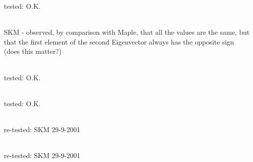 \begin{DoxyRefList}
tested\+: O.\+K.  
\item[Member \doxylink{classcsmp_1_1_tensor_variable_3_013_u_01_4_a911a0e44c37ac1d93f145c097c00348d}{csmp\+::Tensor\+Variable\texorpdfstring{$<$}{<} 3U \texorpdfstring{$>$}{>}\+::Eigen} (\doxylink{classcsmp_1_1_vector_variable_3_013_u_01_4}{Vector\+Variable$<$ 3\+U $>$} \&vv\+Eigenvalues, \doxylink{classcsmp_1_1_tensor_variable_3_013_u_01_4}{Tensor\+Variable$<$ 3\+U $>$} \&tv\+Eigenvectors, bool b\+Normalize) const]\hfill \\
\label{test__test000066}%
%
SKM -\/ observed, by comparison with Maple, that all the values are the same, but that the first element of the second Eigenvector always has the opposite sign (does this matter?) 
\item[Member \doxylink{classcsmp_1_1_tensor_variable_3_013_u_01_4_aa5d0acb3049f7099a61713cdcb63bb6c}{csmp\+::Tensor\+Variable\texorpdfstring{$<$}{<} 3U \texorpdfstring{$>$}{>}\+::Identity} ()]\hfill \\
\label{test__test000058}%
%
tested\+: O.\+K.  
\item[Member \doxylink{classcsmp_1_1_tensor_variable_3_013_u_01_4_ae2dbed54f20a5f66071af484bfe37e03}{csmp\+::Tensor\+Variable\texorpdfstring{$<$}{<} 3U \texorpdfstring{$>$}{>}\+::Inverse} () const]\hfill \\
\label{test__test000061}%
%
tested\+: O.\+K.  
\item[Member \doxylink{classcsmp_1_1_tensor_variable_3_013_u_01_4_ad3b45ec9f9b0c9b6c7b664607525fe05}{csmp\+::Tensor\+Variable\texorpdfstring{$<$}{<} 3U \texorpdfstring{$>$}{>}\+::Is\+Within\+Range} (double vmin, double vmax) const]\hfill \\
\label{test__test000064}%
%
re-\/tested\+: SKM 29-\/9-\/2001  
\item[Member \doxylink{classcsmp_1_1_tensor_variable_3_013_u_01_4_a6aa05318f3258073a8426868cfdf5e9b}{csmp\+::Tensor\+Variable\texorpdfstring{$<$}{<} 3U \texorpdfstring{$>$}{>}\+::Max\+Element} () const]\hfill \\
\label{test__test000063}%
%
re-\/tested\+: SKM 29-\/9-\/2001  
\item[Member \doxylink{classcsmp_1_1_tensor_variable_3_013_u_01_4_a32a7bc89e54cf02bfd4d8950039a865d}{csmp\+::Tensor\+Variable\texorpdfstring{$<$}{<} 3U \texorpdfstring{$>$}{>}\+::Min\+Element} () const]\hfill \\
\label{test__test000062}%

\end{DoxyRefList}
